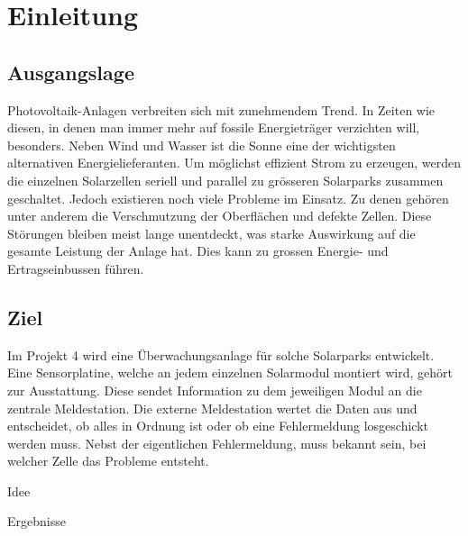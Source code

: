 \documentclass[a4paper]{fhnwreport} %
\begin{document}
\section{Einleitung}

\subsection{Ausgangslage}

Photovoltaik-Anlagen verbreiten sich mit zunehmendem Trend. In Zeiten wie diesen, in denen man immer mehr auf fossile Energieträger verzichten will, besonders. Neben Wind und Wasser ist die Sonne eine der wichtigsten alternativen Energielieferanten. Um möglichst effizient Strom zu erzeugen, werden die einzelnen Solarzellen seriell und parallel zu grösseren Solarparks zusammen geschaltet. Jedoch existieren noch viele Probleme im Einsatz. Zu denen gehören unter anderem die Verschmutzung der Oberflächen und defekte Zellen. Diese Störungen bleiben meist lange unentdeckt, was starke Auswirkung auf die gesamte Leistung der Anlage hat. Dies kann zu grossen Energie- und Ertragseinbussen führen.

\subsection{Ziel}

Im Projekt 4 wird eine Überwachungsanlage für solche Solarparks entwickelt. Eine Sensorplatine, welche an jedem einzelnen Solarmodul montiert wird, gehört zur Ausstattung. Diese sendet Information zu dem jeweiligen Modul an die zentrale Meldestation. Die externe Meldestation wertet die Daten aus und entscheidet, ob alles in Ordnung ist oder ob eine Fehlermeldung losgeschickt werden muss. Nebst der eigentlichen Fehlermeldung, muss bekannt sein, bei welcher Zelle das Probleme entsteht.

Idee

Ergebnisse
\end{document}
